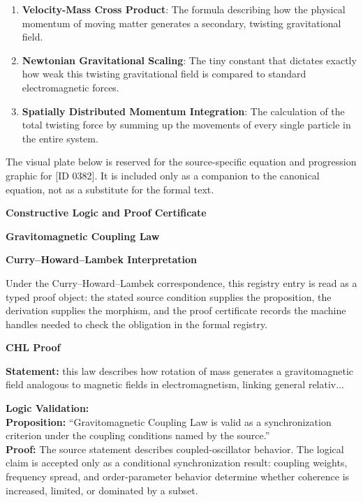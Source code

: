 \begin{enumerate}[leftmargin=1.6em,itemsep=6pt,topsep=4pt]
\item \textbf{Velocity-Mass Cross Product}: The formula describing how the physical momentum of moving matter generates a secondary, twisting gravitational field.
\item \textbf{Newtonian Gravitational Scaling}: The tiny constant that dictates exactly how weak this twisting gravitational field is compared to standard electromagnetic forces.
\item \textbf{Spatially Distributed Momentum Integration}: The calculation of the total twisting force by summing up the movements of every single particle in the entire system.
\end{enumerate}

\begingroup\footnotesize\sloppy
The visual plate below is reserved for the source-specific equation and progression graphic for [ID 0382]. It is included only as a companion to the canonical equation, not as a substitute for the formal text.
\par\endgroup
\ifTZPDarkEdition
{}
\fi

\clearpage
\begingroup\tzpsupportsetup
\noindent\textbf{\fontsize{10.8pt}{12.8pt}\selectfont [ID 0382] Constructive Logic and Proof Certificate}\par
\noindent\textbf{\fontsize{10pt}{12pt}\selectfont Gravitomagnetic Coupling Law}\par
\vspace{0.45em}
\begingroup
\footnotesize
\setlength{\parskip}{0.22em}
\setlength{\parindent}{0pt}
\noindent\textbf{Curry--Howard--Lambek Interpretation}\par
Under the Curry--Howard--Lambek correspondence, this registry entry is read as a typed proof
object: the stated source condition supplies the proposition, the derivation supplies the
morphism, and the proof certificate records the machine handles needed to check the obligation
in the formal registry.

\vspace{0.45em}
\noindent\textbf{CHL Proof}\par
\textbf{Statement:} this law describes how rotation of mass generates a gravitomagnetic field analogous to
magnetic fields in electromagnetism, linking general relativ...

\textbf{Logic Validation:}\\
\textbf{Proposition:} ``Gravitomagnetic Coupling Law is valid as a synchronization criterion under the coupling
conditions named by the source.''\\
\textbf{Proof:} The source statement describes coupled-oscillator behavior. The logical claim is
accepted only as a conditional synchronization result: coupling weights, frequency
spread, and order-parameter behavior determine whether coherence is increased, limited,
or dominated by a subset.

